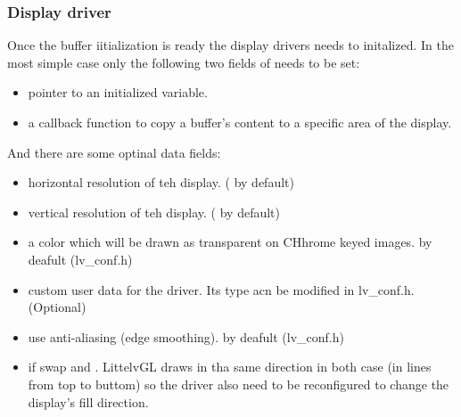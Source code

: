 \documentclass[letterpaper,10pt,english]{sphinxmanual}
\begin{document}
\subsubsection{Display driver}
\label{\detokenize{porting/display:display-driver}}
Once the buffer iitialization is ready the display drivers needs to initalized. In the most simple case only the following two fields of  needs to be set:
\begin{itemize}
\item {} 
 pointer to an initialized  variable.

\item {} 
 a callback function to copy a buffer’s content to a specific area of the display.

\end{itemize}

And there are some optinal data fields:
\begin{itemize}
\item {} 
 horizontal resolution of teh display. ( by default)

\item {} 
 vertical resolution of teh display. ( by default)

\item {} 
 a color which will be drawn as transparent on CHhrome keyed images.  by deafult (lv\_conf.h)

\item {} 
 custom user data for the driver. Its type acn be modified in lv\_conf.h. (Optional)

\item {} 
 use anti-aliasing (edge smoothing).  by deafult (lv\_conf.h)

\item {} 
 if  swap  and . LittelvGL draws in tha same direction in both case (in lines from top to buttom) so the driver also need to be reconfigured to change the display’s fill direction.

\end{itemize}
\end{document}

